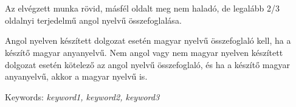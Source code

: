 \chapter*{\summary}

Az elvégzett munka rövid, másfél oldalt meg nem haladó, de legalább 2/3 
oldalnyi terjedelmű angol nyelvű összefoglalása.

Angol nyelven készített dolgozat esetén magyar nyelvű összefoglaló kell, ha a
készítő magyar anyanyelvű. Nem angol vagy nem magyar nyelven készített
dolgozat esetén kötelező az angol nyelvű összefoglaló, és ha a készítő magyar
anyanyelvű, akkor a magyar nyelvű is.

\vspace{0.5cm}
Keywords: \emph{keyword1, keyword2, keyword3}
\vspace{0.5cm}
